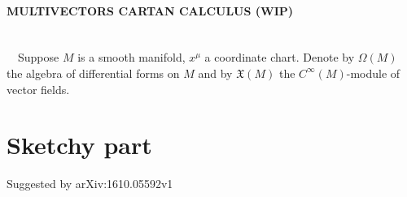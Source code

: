 \documentclass[a4paper,12pt]{scrartcl}
\begin{document}
  \begin{landscape}
    \thispagestyle{empty}
    \noindent
    \paragraph{MULTIVECTORS CARTAN CALCULUS (WIP)}
    	\mbox{}\\
        $\quad$Suppose $M$ is a smooth manifold, $x^\mu$ a coordinate chart. Denote by $\Omega(M)$ the algebra of differential forms on $M$ and by $\mathfrak{X}(M)$ the $C^\infty(M)$-module of vector fields.  \\

  \end{landscape}
  
  \section{Sketchy part}
  	Suggested by arXiv:1610.05592v1
\end{document}
